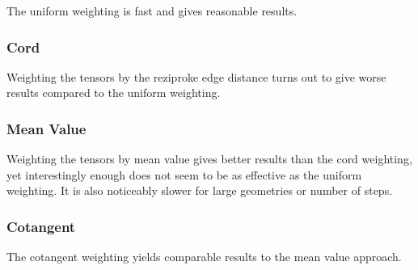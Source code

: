 \documentclass[a4paper,10pt,notitlepage]{scrreprt}
\begin{document}
The uniform weighting is fast and gives reasonable results.

\subsubsection{Cord}

Weighting the tensors by the reziproke edge distance turns out to give worse
results compared to the uniform weighting.

\subsubsection{Mean Value}

Weighting the tensors by mean value gives better results than the cord
weighting, yet interestingly enough does not seem to be as effective as the
uniform weighting. It is also noticeably slower for large geometries or number
of steps.

\subsubsection{Cotangent}

The cotangent weighting yields comparable results to the mean value approach.
\end{document}
